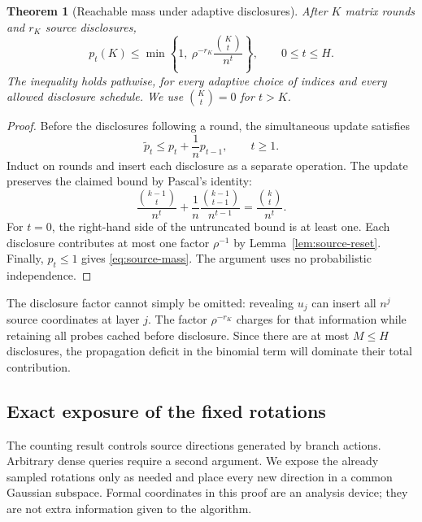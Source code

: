 \documentclass[11pt,letterpaper]{article}
\newtheorem{theorem}{Theorem}[section]
\theoremstyle{definition}
\theoremstyle{remark}
\begin{document}
\begin{theorem}[Reachable mass under adaptive disclosures]
\label{thm:source-counting}
After $K$ matrix rounds and $r_K$ source disclosures,
\begin{equation}
  p_t(K)\leq
  \min\left\{1,\ \rho^{-r_K}\frac{\binom Kt}{n^t}\right\},
  \qquad 0\leq t\leq H.
  \label{eq:source-mass}
\end{equation}
The inequality holds pathwise, for every adaptive choice of indices
and every allowed disclosure schedule.  We use $\binom Kt=0$ for
$t>K$.
\end{theorem}

\begin{proof}
Before the disclosures following a round, the simultaneous update
satisfies
\[
  \widetilde p_t\leq p_t+\frac1n p_{t-1},\qquad t\geq1.
\]
Induct on rounds and insert each disclosure as a separate operation.
The update preserves the claimed bound by Pascal's identity:
\[
  \frac{\binom{k-1}{t}}{n^t}
  +\frac1n\frac{\binom{k-1}{t-1}}{n^{t-1}}
  =\frac{\binom kt}{n^t}.
\]
For $t=0$, the right-hand side of the untruncated bound is at least
one.  Each disclosure contributes at most one factor $\rho^{-1}$
by Lemma~\ref{lem:source-reset}.  Finally, $p_t\leq1$ gives
\eqref{eq:source-mass}.  The argument uses no probabilistic
independence.
\end{proof}

The disclosure factor cannot simply be omitted: revealing $u_j$
can insert all $n^j$ source coordinates at layer $j$.  The factor
$\rho^{-r_K}$ charges for that information while retaining all
probes cached before disclosure.  Since there are at most $M\leq H$
disclosures, the propagation deficit in the binomial term will
dominate their total contribution.

\subsection{Exact exposure of the fixed rotations}
\label{app:source:coupling}

The counting result controls source directions generated by branch
actions.  Arbitrary dense queries require a second argument.  We
expose the already sampled rotations only as needed and place every
new direction in a common Gaussian subspace.  Formal coordinates
in this proof are an analysis device; they are not extra information
given to the algorithm.
\end{document}
